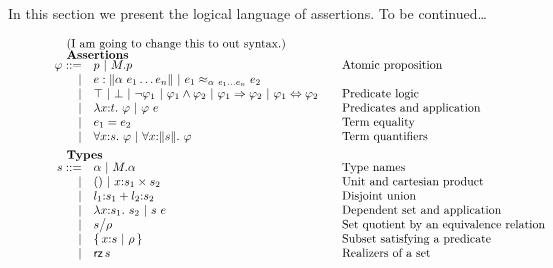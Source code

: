 In this section we present the logical language of assertions. To be
continued\dots

\begin{figure}
	\[
	\begin{array}{rl@{\qquad}l}
          \noalign{(I am going to change this to out syntax.)}
		\noalign{\textbf{Assertions}}
		\ip ::= 
		    & \iP\ |\ \iselect{\im}{\iP}&\mbox{Atomic
                      proposition}\\
                    | & \ie : \support{\iapp{\iS}{\ie_1 \ldots
                        \ie_n}} \ | \ \ie_1 \iper{\iapp{\iS}{\ie_1
                        \ldots \ie_n}} \ie_2 \\
		  | & \itrue \ | \ \ifalse\ |\ \inot{\ip_1}\ |\ \iand{\ip_1}{\ip_2}\ |\ 
		       \iimply{\ip_1}{\ip_2}\ |\ \iiff{\ip_1}{\ip_2} & \mbox{Predicate logic}\\
		  | & \ilambda{\ix}{\ity}{\ip} \ |\ \iapp{\ip}{\ie} & \mbox{Predicates and application}\\
		  | & \iequal{\ie_1}{\ie_2} & \mbox{Term equality}\\
		  | & \iforall{\ix}{\is}{\ip} \ |\ 
		      \iforall{\ix}{\support{\is}}{\ip} & \mbox{Term quantifiers}\\[5pt]
		
		\noalign{\textbf{Types}}
		\is ::= 
		    & \iS \ |\ \iselect{\im}{\iS} &\mbox{Type names}\\
		  | & ()\ |\ \iprod{\ix}{\is_1}{\is_2} &\mbox{Unit and cartesian product}\\
		  | & \isum{\il_1}{\is_1}{\il_2}{\is_2} &\mbox{Disjoint union}\\
		  | & \ilambda{\ix}{\is_1}{\is_2}\ |\ 
		      \iapp{\is}{\ie} &\mbox{Dependent set and application}\\
		  | & \iquot{\is}{\ipp} & \mbox{Set quotient by an equivalence relation}\\
		  | & \isubset{\ix}{\is}{\ipp} & \mbox{Subset satisfying a predicate}\\
		  | & \irz{\is}&\mbox{Realizers of a set}\\[5pt] 
		

\end{array}\]
\end{figure}
